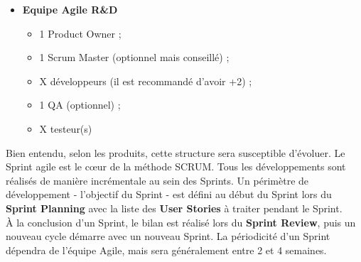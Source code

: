 \begin{itemize}
\item \textbf{Equipe Agile R\&D}
\begin{itemize}
    \item 1 Product Owner ;
    \item 1 Scrum Master (optionnel mais conseillé) ;
    \item X développeurs (il est recommandé d'avoir +2) ;
    \item 1 QA (optionnel) ;
    \item X testeur(s)
\end{itemize}
\end{itemize}
Bien entendu, selon les produits, cette structure sera susceptible d'évoluer.
Le Sprint agile est le cœur de la méthode SCRUM. Tous les développements sont réalisés de manière incrémentale au sein des Sprints. Un périmètre de développement - l'objectif du Sprint - est défini au début du Sprint lors du \textbf{Sprint Planning} avec la liste des \textbf{User Stories} à traiter pendant le Sprint.\\

À la conclusion d'un Sprint, le bilan est réalisé lors du \textbf{Sprint Review}, puis un nouveau cycle démarre avec un nouveau Sprint. La périodicité d'un Sprint dépendra de l'équipe Agile, mais sera généralement entre 2 et 4 semaines.

